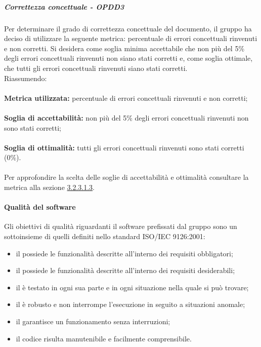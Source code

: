 \documentclass[PianoDiQualifica.tex]{subfiles}
\begin{document}
				\subparagraph{Correttezza concettuale - OPDD3}
				Per determinare il grado di correttezza concettuale del documento, il gruppo ha deciso di utilizzare la seguente metrica: percentuale di errori concettuali rinvenuti e non corretti.
				Si desidera come soglia minima accettabile che non più del 5\% degli errori concettuali rinvenuti non siano stati corretti e, come soglia ottimale, che tutti gli errori
				concettuali rinvenuti siano stati corretti.\\
				Riassumendo: \\ \\
				\textbf{Metrica utilizzata:} percentuale di errori concettuali rinvenuti e non corretti; \\ \\
				\textbf{Soglia di accettabilità:} non più del 5\% degli errori concettuali rinvenuti non sono stati corretti;\\ \\
				\textbf{Soglia di ottimalità:} tutti gli errori concettuali rinvenuti sono stati corretti (0\%). \\ \\
				Per approfondire la scelta delle soglie di accettabilità e ottimalità consultare la metrica alla sezione \hyperlink{err_concettuali}{3.2.3.1.3}.
				
			\paragraph{Qualità del software}
			Gli obiettivi di qualità riguardanti il software prefissati dal gruppo \GRUPPO{} sono un sottoinsieme di quelli definiti nello standard ISO/IEC 9126:2001:
			\begin{itemize}
				\item il  possiede le funzionalità descritte all’interno dei requisiti obbligatori;
				\item il  possiede le funzionalità descritte all’interno dei requisiti desiderabili;
				\item il  è testato in ogni sua parte e in ogni situazione nella quale si può trovare;
				\item il  è robusto e non interrompe l’esecuzione in seguito a situazioni anomale;
				\item il  garantisce un funzionamento senza interruzioni;
				\item il codice risulta manutenibile e facilmente comprensibile.
			\end{itemize}
			
\end{document}
